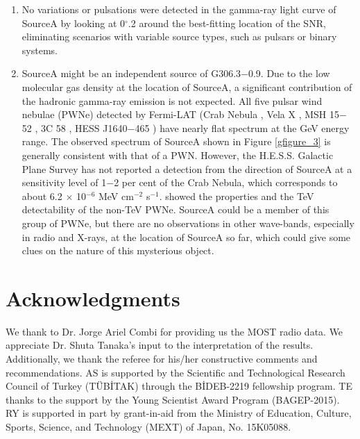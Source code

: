 \documentclass[useAMS,usenatbib]{mn2e}
\begin{document}
\begin{enumerate}
\item No variations or pulsations were detected in the gamma-ray light curve of SourceA by looking at 0$^{\circ}\!\!$.2 around the best-fitting location of the SNR, eliminating scenarios with variable source types, such as pulsars or binary systems. 

\item SourceA might be an independent source of G306.3$-$0.9. Due to the low molecular gas density at the location of SourceA, a significant contribution of the hadronic gamma-ray emission is not expected. All five pulsar wind nebulae (PWNe) detected by Fermi-LAT (Crab Nebula \citep{Ab10a}, Vela X \citep{Ab10b}, MSH 15$-$52 \citep{Ab10c}, 3C 58 \citep{Ab13b}, HESS J1640$-$465 \citep{Sl10}) have nearly flat spectrum at the GeV energy range. The observed spectrum of SourceA shown in Figure \ref{gfigure_3} is generally consistent with that of a PWN. However, the H.E.S.S. Galactic Plane Survey \citep{Do16} has not reported a detection from the direction of SourceA at a sensitivity level of 1$-$2 per cent of the Crab Nebula, which corresponds to about 6.2 $\times$ 10$^{-6}$ MeV cm$^{-2}$ s$^{-1}$. \citet{Ta13} showed the properties and the TeV detectability of the non-TeV PWNe. SourceA could be a member of this group of PWNe, but there are no observations in other wave-bands, especially in radio and X-rays, at the location of SourceA so far, which  could give some clues on the nature of this mysterious object.

\end{enumerate}

\section*{Acknowledgments}

We thank to Dr. Jorge Ariel Combi for providing us the MOST radio data. We appreciate Dr. Shuta Tanaka's input to the interpretation of the results. Additionally, we thank the referee for his/her constructive comments and recommendations. AS is supported by the Scientific and Technological Research Council of Turkey (T\"{U}B\.{I}TAK) through the B\.{I}DEB-2219 fellowship program. TE thanks to the support by the Young Scientist Award Program (BAGEP-2015). RY is supported in part by grant-in-aid from the Ministry of Education, Culture, Sports, Science, and Technology (MEXT) of Japan, No. 15K05088.

$~$

$~$
\end{document}
